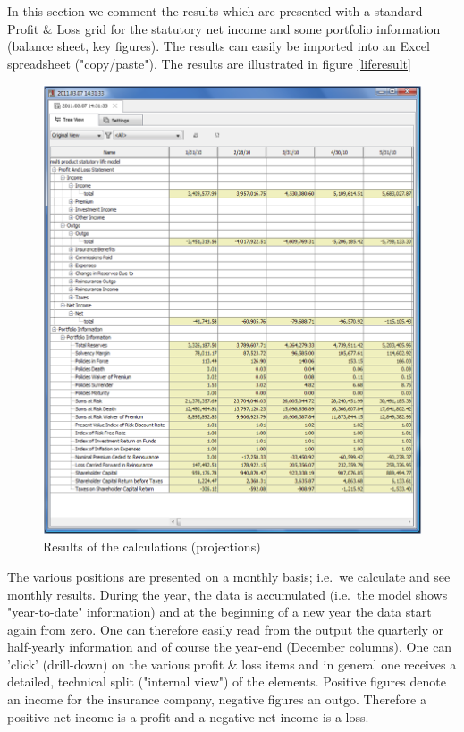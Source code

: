 In this section we comment the results which are presented with a standard Profit \& Loss grid for the statutory net income and some portfolio information (balance sheet, key figures). The results can easily be imported into an Excel spreadsheet ("copy/paste"). The results are illustrated in figure \ref{liferesult}

\begin{figure}
\includegraphics[scale=0.7]{images/liferesult.png}
	\caption{Results of the calculations (projections)}
	\label{fig:liferesult}
\end{figure}

The various positions are presented on a monthly basis; i.e.~we calculate and see monthly results. During the year, the data is accumulated (i.e.~the model shows "year-to-date" information) and at the beginning of a new year the data start again from zero. One can therefore easily read from the output the quarterly or half-yearly information and of course the year-end (December columns). One can 'click' (drill-down) on the various profit \& loss items and in general one receives a detailed, technical split ("internal view") of the elements. Positive figures denote an income for the insurance company, negative figures an outgo. Therefore a positive net income is a profit and a negative net income is a loss.

